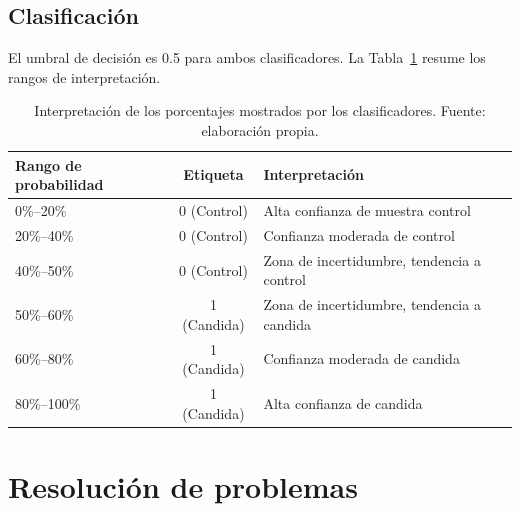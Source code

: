 \documentclass[11pt,a4paper,spanish]{book}
\begin{document}
\section{Clasificaci\'{o}n}

El umbral de decisi\'{o}n es 0.5 para ambos clasificadores. La Tabla~\ref{tab:interpretacion-probabilidades} resume los rangos de interpretaci\'{o}n.

\begin{table}[ht]
\centering
\begin{tabular}{l c p{6.5cm}}
\hline\hline
Rango de probabilidad & Etiqueta & Interpretaci\'{o}n \\ [0.5ex]
\hline
0\%--20\% & 0 (Control) & Alta confianza de muestra control \\
20\%--40\% & 0 (Control) & Confianza moderada de control \\
40\%--50\% & 0 (Control) & Zona de incertidumbre, tendencia a control \\
50\%--60\% & 1 (Candida) & Zona de incertidumbre, tendencia a candida \\
60\%--80\% & 1 (Candida) & Confianza moderada de candida \\
80\%--100\% & 1 (Candida) & Alta confianza de candida \\
\hline
\end{tabular}
\caption[Interpretaci\'{o}n de probabilidades]{Interpretaci\'{o}n de los porcentajes mostrados por los clasificadores. Fuente: elaboraci\'{o}n propia.}
\label{tab:interpretacion-probabilidades}
\end{table}

\chapter{Resoluci\'{o}n de problemas}
\end{document}
